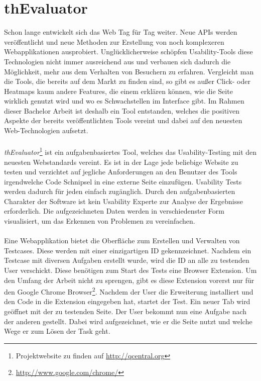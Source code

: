 %
%
%
%

\chapter{thEvaluator}

Schon lange entwickelt sich das Web Tag für Tag weiter. Neue APIs werden veröffentlicht und neue Methoden zur Erstellung von noch komplexeren Webapplikationen ausprobiert. Unglücklicherweise schöpfen Usability-Tools diese Technologien nicht immer ausreichend aus und verbauen sich dadurch die Möglichkeit, mehr aus dem Verhalten von Besuchern zu erfahren. Vergleicht man die Tools, die bereits auf dem Markt zu finden sind, so gibt es außer Click- oder Heatmaps kaum andere Features, die einem erklären können, wie die Seite wirklich genutzt wird und wo es Schwachstellen im Interface gibt. Im Rahmen dieser Bachelor Arbeit ist deshalb ein Tool entstanden, welches die positiven Aspekte der bereits veröffentlichten Tools vereint und dabei auf den neuesten Web-Technologien aufsetzt.\\
\\
\textit{thEvaluator}\footnote{Projektwebsite zu finden auf \url{http://qcentral.org}} ist ein aufgabenbasiertes Tool, welches das Usability-Testing mit den neuesten Webstandards vereint. Es ist in der Lage jede beliebige Website zu testen und verzichtet auf jegliche Anforderungen an den Benutzer des Tools irgendwelche Code Schnipsel in eine externe Seite einzufügen. Usability Tests werden dadurch für jeden einfach zugänglich. Durch den aufgabenbasierten Charakter der Software ist kein Usability Experte zur Analyse der Ergebnisse erforderlich. Die aufgezeichneten Daten werden in verschiedenster Form visualisiert, um das Erkennen von Problemen zu vereinfachen.\\
\\
Eine Webapplikation bietet die Oberfläche zum Erstellen und Verwalten von Testcases. Diese werden mit einer einzigartigen ID gekennzeichnet. Nachdem ein Testcase mit diversen Aufgaben erstellt wurde, wird die ID an alle zu testenden User verschickt. Diese benötigen zum Start des Tests eine Browser Extension. Um den Umfang der Arbeit nicht zu sprengen, gibt es diese Extension vorerst nur für den Google Chrome Browser\footnote{\url{http://www.google.com/chrome/}}. Nachdem der User die Erweiterung installiert und den Code in die Extension eingegeben hat, startet der Test. Ein neuer Tab wird geöffnet mit der zu testenden Seite. Der User bekommt nun eine Aufgabe nach der anderen gestellt. Dabei wird aufgezeichnet, wie er die Seite nutzt und welche Wege er zum Lösen der Task geht.







